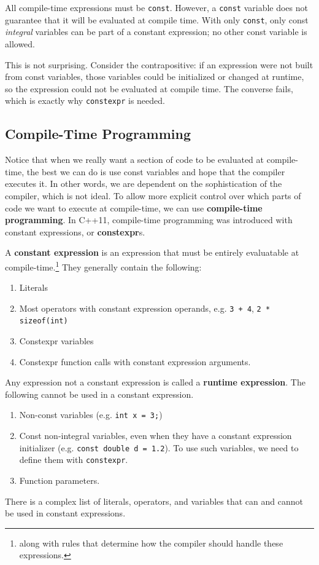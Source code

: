 \documentclass{article}
\newcounter{definition}[section]
\newcounter{code}[section]
\begin{document}
    All compile-time expressions must be \texttt{const}. However, a \texttt{const} variable does not guarantee that it will be evaluated at compile time. With only \texttt{const}, only const \textit{integral} variables can be part of a constant expression; no other const variable is allowed.

    This is not surprising. Consider the contrapositive: if an expression were not built from const variables, those variables could be initialized or changed at runtime, so the expression could not be evaluated at compile time. The converse fails, which is exactly why \texttt{constexpr} is needed.

  \subsection{Compile-Time Programming}  
    
    Notice that when we really want a section of code to be evaluated at compile-time, the best we can do is use const variables and hope that the compiler executes it. In other words, we are dependent on the sophistication of the compiler, which is not ideal. To allow more explicit control over which parts of code we want to execute at compile-time, we can use \textbf{compile-time programming}. In C++11, compile-time programming was introduced with constant expressions, or \textbf{constexpr}s.

    \begin{definition}
      \label{def:constant-expression}
      A \textbf{constant expression} is an expression that must be entirely evaluatable at compile-time.\footnote{along with rules that determine how the compiler should handle these expressions.} They generally contain the following: 
      \begin{enumerate}
        \item Literals 
        \item Most operators with constant expression operands, e.g. \texttt{3 + 4}, \texttt{2 * sizeof(int)} 
        \item Constexpr variables  
        \item Constexpr function calls with constant expression arguments. 
      \end{enumerate}
      Any expression not a constant expression is called a \textbf{runtime expression}. The following cannot be used in a constant expression. 
      \begin{enumerate}
        \item Non-const variables (e.g. \texttt{int x = 3;}) 
        \item Const non-integral variables, even when they have a constant expression initializer (e.g. \texttt{const double d = 1.2}). To use such variables, we need to define them with \texttt{constexpr}. 
        \item Function parameters. 
      \end{enumerate}
      There is a complex list of literals, operators, and variables that can and cannot be used in constant expressions. 
    \end{definition}
\end{document}
